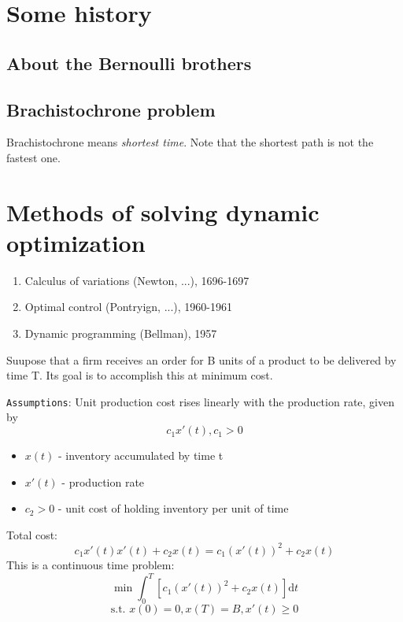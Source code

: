\documentclass[twoside]{article}
\begin{document}

\section{Some history} 

  \subsection{About the Bernoulli brothers} 

  \subsection{Brachistochrone problem} 
    Brachistochrone means \textit{shortest time}. Note that the shortest path is not the fastest one.

\section{Methods of solving dynamic optimization}
  \begin{enumerate}
    \item Calculus of variations (Newton, ...), 1696-1697
    \item Optimal control (Pontryign, ...), 1960-1961
    \item Dynamic programming (Bellman), 1957
  \end{enumerate}

\begin{example}
  Suupose that a firm receives an order for B units of a product to be delivered by time T. Its goal is to accomplish this at minimum cost.

  {\tt Assumptions}: Unit production cost rises linearly with the production rate, given by
  \[c_1 x'(t), c_1 > 0\]
  \begin{itemize}
    \item $x(t)$ - inventory accumulated by time t
    \item $x'(t)$ - production rate
    \item $c_2>0$ - unit cost of holding inventory per unit of time
  \end{itemize}

  Total cost:
  $$c_1 x'(t) x'(t) + c_2 x(t) = c_1 (x'(t))^2 + c_2 x(t)$$
  This is a continuous time problem:
  $$\min \int_0^T [c_1 (x'(t))^2 + c_2 x(t)] \mathrm{d}t$$
  $$\text{s.t.  } x(0) = 0, x(T) = B, x'(t) \geq 0 $$
\end{example}
\end{document}
